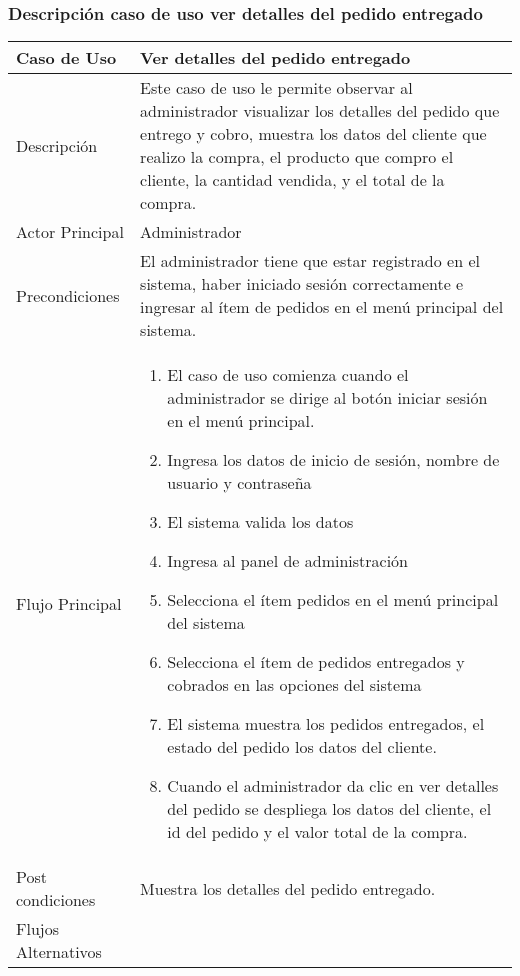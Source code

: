 \documentclass[12pt,a4paper]{article}
\begin{document}
    \newpage
\subsubsection*{Descripción caso de uso ver detalles del pedido entregado}
\begin{table}[h]
        \centering
        \begin{tabular}{| p{3cm}| p{11cm} |} 
        \hline  
        Caso de Uso         &    \textbf{Ver detalles del pedido entregado }   \\ 
        \hline
        Descripción         &  Este caso de uso le permite observar al administrador visualizar los detalles del pedido que entrego y cobro, muestra los datos del cliente que realizo la compra, el producto que compro el cliente, la cantidad vendida, y el total de la compra.     \\ 
        \hline
        Actor Principal     &   Administrador   \\ 
        \hline
        Precondiciones      & El administrador tiene que estar registrado en el sistema, haber iniciado sesión correctamente e ingresar al ítem de pedidos en el menú principal del sistema.    	\\
        \hline
        Flujo Principal     &    

            \begin{enumerate}
                \item El caso de uso comienza cuando el administrador se dirige al botón iniciar sesión en el menú principal.
                \item Ingresa los datos de inicio de sesión, nombre de usuario y contraseña
                \item El sistema valida los datos
                \item Ingresa al panel de administración
                \item Selecciona el ítem pedidos en el menú principal del sistema
                \item Selecciona el ítem de pedidos entregados y cobrados en las opciones del sistema
                \item El sistema muestra los pedidos entregados, el estado del pedido los datos del cliente.
                \item Cuando el administrador da clic en ver detalles del pedido se despliega los datos del cliente, el id del pedido y el valor total de la compra.
            \end{enumerate}
        \\  
        \hline
        Post condiciones    &   Muestra los detalles del pedido entregado.    \\  
        \hline
        Flujos Alternativos &       \\  
        \hline
        \end{tabular}
    \end{table}
\end{document}

